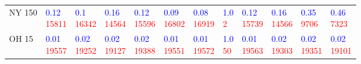 \begin{tabular}{llllllllllll}
NY 150 &  \makecell{\textcolor{blue}{0.12} \\ \textcolor{red}{15811}} &   \makecell{\textcolor{blue}{0.1} \\ \textcolor{red}{16342}} &  \makecell{\textcolor{blue}{0.16} \\ \textcolor{red}{14564}} &  \makecell{\textcolor{blue}{0.12} \\ \textcolor{red}{15596}} &  \makecell{\textcolor{blue}{0.09} \\ \textcolor{red}{16802}} &  \makecell{\textcolor{blue}{0.08} \\ \textcolor{red}{16919}} &     \makecell{\textcolor{blue}{1.0} \\ \textcolor{red}{2}} &  \makecell{\textcolor{blue}{0.12} \\ \textcolor{red}{15739}} &  \makecell{\textcolor{blue}{0.16} \\ \textcolor{red}{14566}} &   \makecell{\textcolor{blue}{0.35} \\ \textcolor{red}{9706}} &   \makecell{\textcolor{blue}{0.46} \\ \textcolor{red}{7323}} \\
OH 15  &  \makecell{\textcolor{blue}{0.01} \\ \textcolor{red}{19557}} &  \makecell{\textcolor{blue}{0.02} \\ \textcolor{red}{19252}} &  \makecell{\textcolor{blue}{0.02} \\ \textcolor{red}{19127}} &  \makecell{\textcolor{blue}{0.02} \\ \textcolor{red}{19388}} &  \makecell{\textcolor{blue}{0.01} \\ \textcolor{red}{19551}} &  \makecell{\textcolor{blue}{0.01} \\ \textcolor{red}{19572}} &    \makecell{\textcolor{blue}{1.0} \\ \textcolor{red}{50}} &  \makecell{\textcolor{blue}{0.01} \\ \textcolor{red}{19563}} &  \makecell{\textcolor{blue}{0.02} \\ \textcolor{red}{19303}} &  \makecell{\textcolor{blue}{0.02} \\ \textcolor{red}{19351}} &  \makecell{\textcolor{blue}{0.02} \\ \textcolor{red}{19101}} \\

\end{tabular}
